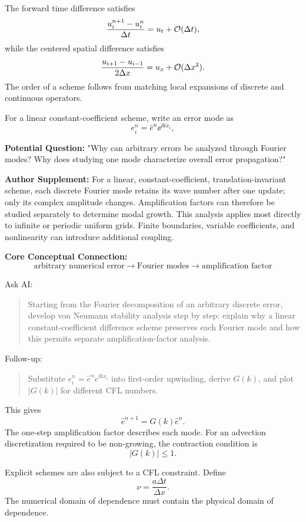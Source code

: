 The forward time difference satisfies
\[
\frac{u_i^{n+1}-u_i^n}{\Delta t}
=
u_t+\mathcal O(\Delta t),
\]
while the centered spatial difference satisfies
\[
\frac{u_{i+1}-u_{i-1}}{2\Delta x}
=
u_x+\mathcal O(\Delta x^2).
\]
The order of a scheme follows from matching local expansions of discrete and continuous operators.

For a linear constant-coefficient scheme, write an error mode as
\[
e_i^n=\widehat e^n\ee^{\ii kx_i},
\]

\begin{authornote}
\textbf{Potential Question:}
"Why can arbitrary errors be analyzed through Fourier modes? Why does studying one mode characterize overall error propagation?"

\textbf{Author Supplement:}
For a linear, constant-coefficient, translation-invariant scheme, each discrete Fourier mode retains its wave number after one update; only its complex amplitude changes. Amplification factors can therefore be studied separately to determine modal growth. This analysis applies most directly to infinite or periodic uniform grids. Finite boundaries, variable coefficients, and nonlinearity can introduce additional coupling.

\textbf{Core Conceptual Connection:}
\[
\text{arbitrary numerical error}
\longrightarrow
\text{Fourier modes}
\longrightarrow
\text{amplification factor}
\]
\end{authornote}

\begin{askai}
Ask AI:
\begin{quote}
Starting from the Fourier decomposition of an arbitrary discrete error, develop von Neumann stability analysis step by step: explain why a linear constant-coefficient difference scheme preserves each Fourier mode and how this permits separate amplification-factor analysis.
\end{quote}

Follow-up:
\begin{quote}
Substitute \(e_i^n=\widehat e^n e^{\ii kx_i}\) into first-order upwinding, derive \(G(k)\), and plot \(|G(k)|\) for different CFL numbers.
\end{quote}
\end{askai}

This gives
\[
\widehat e^{n+1}=G(k)\widehat e^n.
\]
The one-step amplification factor describes each mode. For an advection discretization required to be non-growing, the contraction condition is
\[
|G(k)|\le1.
\]

Explicit schemes are also subject to a CFL constraint. Define
\[
\nu=\frac{a\Delta t}{\Delta x}.
\]
The numerical domain of dependence must contain the physical domain of dependence.

